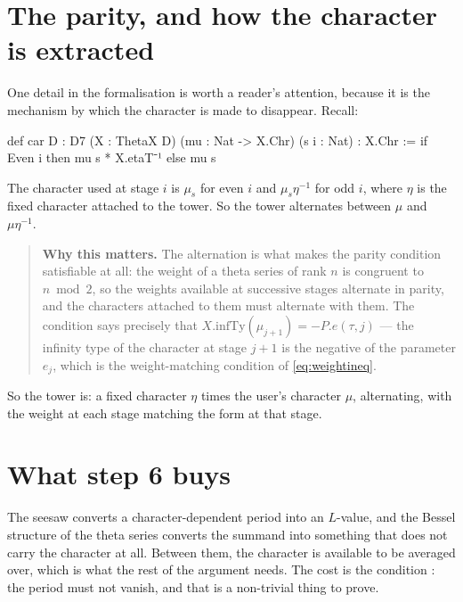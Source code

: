\section{The parity, and how the character is extracted}One detail in the formalisation is worth a reader's attention, because it is
the mechanism by which the character is made to disappear. Recall:

\begin{seamnote}{}
{\footnotesize
\begin{leanquote}
def car {D : D7} (X : ThetaX D) (mu : Nat -> X.Chr) (s i :
  Nat) : X.Chr :=
  if Even i then mu s * X.etaT⁻¹ else mu s
\end{leanquote}
}
\end{seamnote}

The character used at stage $i$ is $\mu_s$ for even $i$ and $\mu_s\eta^{-1}$ for
odd $i$, where $\eta$ is the fixed character attached to the tower. So the
tower alternates between $\mu$ and $\mu\eta^{-1}$.

\begin{quote}
\textbf{Why this matters.} The alternation is what makes the parity condition
 satisfiable at all: the weight of a theta series of rank $n$ is
congruent to $n \bmod 2$, so the weights available at successive stages
alternate in parity, and the characters attached to them must alternate with
them. The condition  says precisely that
$X.\mathrm{infTy}(\mu_{j+1}) = -P.e(\tau, j)$ --- the infinity type of the
character at stage $j+1$ is the negative of the parameter $e_j$, which is the
weight-matching condition of \eqref{eq:weightineq}.
\end{quote}

So the tower is: a fixed character $\eta$ times the user's character $\mu$,
alternating, with the weight at each stage matching the form at that stage.

\section{What step 6 buys}The seesaw converts a character-dependent period into an $L$-value, and the
Bessel structure of the theta series converts the summand into something that
does not carry the character at all. Between them, the character is available
to be averaged over, which is what the rest of the argument needs. The cost
is the condition : the period must not vanish, and that is a
non-trivial thing to prove.

